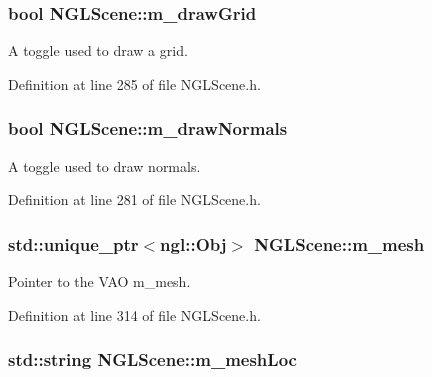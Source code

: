 \subsubsection[{m\-\_\-draw\-Grid}]{\setlength{\rightskip}{0pt plus 5cm}bool N\-G\-L\-Scene\-::m\-\_\-draw\-Grid\hspace{0.3cm}{\ttfamily [private]}}\label{class_n_g_l_scene_a2fc7ca367a266021b9e625ac4c16b6a7}


A toggle used to draw a grid. 



Definition at line 285 of file N\-G\-L\-Scene.\-h.

\subsubsection[{m\-\_\-draw\-Normals}]{\setlength{\rightskip}{0pt plus 5cm}bool N\-G\-L\-Scene\-::m\-\_\-draw\-Normals\hspace{0.3cm}{\ttfamily [private]}}\label{class_n_g_l_scene_a03d4d58046629f535022578a9a03217d}


A toggle used to draw normals. 



Definition at line 281 of file N\-G\-L\-Scene.\-h.

\subsubsection[{m\-\_\-mesh}]{\setlength{\rightskip}{0pt plus 5cm}std\-::unique\-\_\-ptr$<$ngl\-::\-Obj$>$ N\-G\-L\-Scene\-::m\-\_\-mesh\hspace{0.3cm}{\ttfamily [private]}}\label{class_n_g_l_scene_aa6e6165f7bc8e4ddc6e25aaaeda5ad73}


Pointer to the V\-A\-O m\-\_\-mesh. 



Definition at line 314 of file N\-G\-L\-Scene.\-h.

\subsubsection[{m\-\_\-mesh\-Loc}]{\setlength{\rightskip}{0pt plus 5cm}std\-::string N\-G\-L\-Scene\-::m\-\_\-mesh\-Loc\hspace{0.3cm}{\ttfamily [private]}}\label{class_n_g_l_scene_a2442ac60e1c5200ea2107ff8fc44e844}


